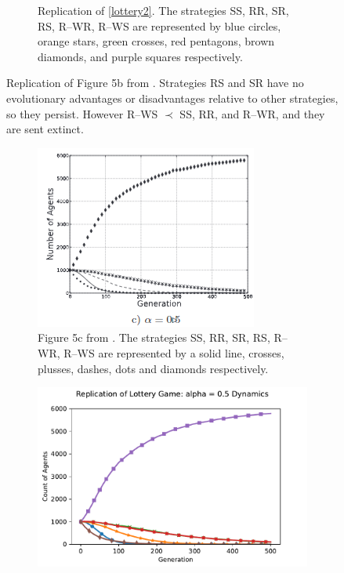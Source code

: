 \begin{figure}[!h]
\begin{subfigure}[b]{0.45\textwidth}
    \caption{Replication of \ref{lottery2}. The strategies SS, RR, SR, RS, R--WR, R--WS are represented by blue circles, orange stars, green crosses, red pentagons, brown diamonds, and purple squares respectively.}
    \label{lottery2_me}
  \end{subfigure}
  \caption{Replication of Figure 5b from \cite{RN30}. Strategies RS and SR have no evolutionary advantages or disadvantages relative to other strategies, so they persist. However R--WS $\prec$ SS, RR, and R--WR, and they are sent extinct.} \label{lottery_comp1}
\end{figure} 
\FloatBarrier



\FloatBarrier 
\begin{figure}[!h]
  \begin{subfigure}[b]{0.45\textwidth}
    \includegraphics[width=\textwidth]{images/lottery3.png}
    \caption{Figure 5c from \cite{RN30}. The strategies SS, RR, SR, RS, R--WR, R--WS are represented by a solid line, crosses, plusses, dashes, dots and diamonds respectively. }
    \label{lottery3}
  \end{subfigure}
  \hfill
  \begin{subfigure}[b]{0.45\textwidth}
    \includegraphics[width=1.25\textwidth]{images/lottery3_me.pdf}

\end{subfigure}
\end{figure}
